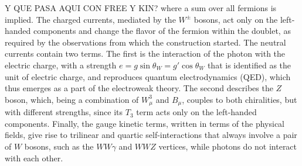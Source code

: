 Y QUE PASA AQUI CON FREE Y KIN?
where a sum over all fermions is implied. The charged currents, mediated by the $W^\pm$ bosons, act only on the left-handed components and change the flavor of the fermion within the doublet, as required by the observations from which the construction started. The neutral currents contain two terms. The first is the interaction of the photon with the electric charge, with a strength $e = g\sin\theta_W = g'\cos\theta_W$ that is identified as the unit of electric charge, and reproduces quantum electrodynamics (QED), which thus emerges as a part of the electroweak theory. The second describes the $Z$ boson, which, being a combination of $W^3_\mu$ and $B_\mu$, couples to both chiralities, but with different strengths, since its $T_3$ term acts only on the left-handed components. Finally, the gauge kinetic terms, written in terms of the physical fields, give rise to trilinear and quartic self-interactions that always involve a pair of $W$ bosons, such as the $WW\gamma$ and $WWZ$ vertices, while photons do not interact with each other.\medskip


